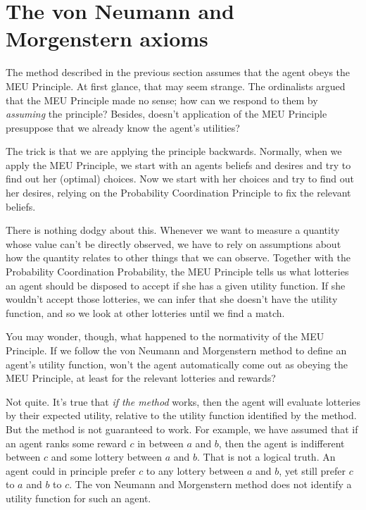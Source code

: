 \section{The von Neumann and Morgenstern axioms}\label{sec:vnm}

The method described in the previous section assumes that the agent
obeys the MEU Principle. At first glance, that may seem strange. The
ordinalists argued that the MEU Principle made no sense; how can we
respond to them by \emph{assuming} the principle? Besides, doesn't
application of the MEU Principle presuppose that we already know the
agent's utilities?

The trick is that we are applying the principle backwards. Normally,
when we apply the MEU Principle, we start with an agents beliefs and
desires and try to find out her (optimal) choices. Now we start with her
choices and try to find out her desires, relying on the Probability
Coordination Principle to fix the relevant beliefs.

There is nothing dodgy about this. Whenever we want to measure a
quantity whose value can't be directly observed, we have to rely on
assumptions about how the quantity relates to other things that we can
observe. Together with the Probability Coordination Probability, the
MEU Principle tells us what lotteries an agent should be disposed to
accept if she has a given utility function. If she wouldn't accept
those lotteries, we can infer that she doesn't have the utility
function, and so we look at other lotteries until we find a match.

You may wonder, though, what happened to the normativity of the MEU
Principle. If we follow the von Neumann and Morgenstern method to
define an agent's utility function, won't the agent automatically come
out as obeying the MEU Principle, at least for the relevant lotteries
and rewards? 

Not quite. It's true that \emph{if the method} works, then the agent
will evaluate lotteries by their expected utility, relative to the
utility function identified by the method. But the method is not
guaranteed to work. For example, we have assumed that if an agent
ranks some reward $c$ in between $a$ and $b$, then the agent is
indifferent between $c$ and some lottery between $a$ and $b$. That is
not a logical truth. An agent could in principle prefer $c$ to any
lottery between $a$ and $b$, yet still prefer $c$ to $a$ and $b$ to
$c$.  The von Neumann and Morgenstern method does not identify a
utility function for such an agent.

